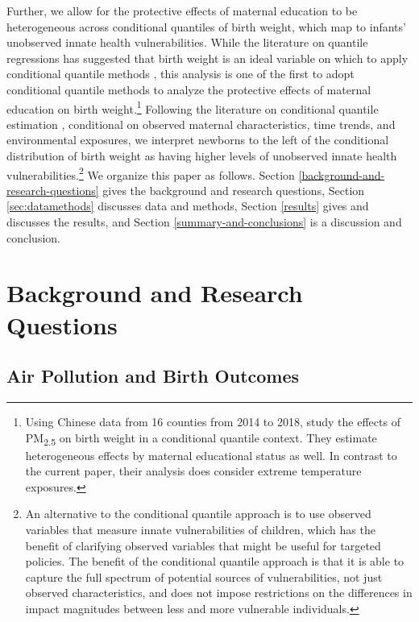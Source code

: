Further, we allow for the protective effects of maternal education to be
heterogeneous across conditional quantiles of birth weight, which map to infants' unobserved innate health vulnerabilities. While the literature on quantile regressions has suggested that birth weight is an ideal variable on which to apply conditional quantile methods \autocite{koenker_quantile_2001}, this analysis is one of the first to adopt conditional quantile methods to analyze the protective effects of maternal education on birth weight.\footnote{Using Chinese data from 16 counties from 2014 to 2018, \textcite{wu_effects_2021} study the effects of PM\textsubscript{2.5} on birth weight in a conditional quantile context. They estimate heterogeneous effects by maternal educational status as well. In contrast to the current paper, their analysis does consider extreme temperature exposures.} Following the literature on
conditional quantile estimation \autocite{abrevaya_effects_2001, arias_individual_2001, abrevaya_effects_2008}, conditional on observed maternal
characteristics, time trends, and environmental exposures, we interpret
newborns to the left of the conditional distribution of birth weight as
having higher levels of unobserved innate health vulnerabilities.\footnote{An alternative to the conditional quantile approach is to use observed variables that measure innate vulnerabilities of children, which has the benefit of clarifying observed variables that might be useful for targeted policies. The benefit of the conditional quantile approach is that it is able to capture the full spectrum of potential sources of vulnerabilities, not just observed characteristics, and does not impose restrictions on the differences in impact magnitudes between less and more vulnerable individuals.} We organize this paper as follows. Section \ref{background-and-research-questions} gives the background and research questions, Section \ref{sec:datamethods} discusses data and methods, Section \ref{results} gives and discusses the results, and Section \ref{summary-and-conclusions} is a discussion and conclusion.

\section{Background and Research Questions\label{background-and-research-questions}}

\subsection{Air Pollution and Birth Outcomes\label{air-pollution-and-birth-outcomes}}

